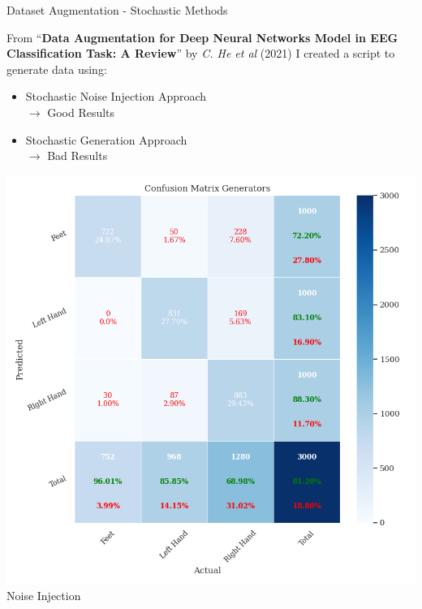 \begin{frame}{Dataset Augmentation - Stochastic Methods}
    \begin{minipage}[c]{.65\textwidth}            
        From ``\textbf{Data Augmentation for Deep Neural Networks Model in EEG Classification Task: A Review}'' by \textit{C. He et al} (2021) I created a script to generate data using:
        \begin{itemize}
            \item Stochastic Noise Injection Approach\\$\rightarrow{}$ Good Results
            \item Stochastic Generation Approach\\$\rightarrow{}$ Bad Results
        \end{itemize}
    \end{minipage}
    \begin{minipage}[c]{.33\textwidth}
            \centering
            \includegraphics[width=.8\textwidth]{figures/augmentation/stochastic/confusion_matrix_generators_2024_03_30_18_00_20_noise_injector_using_LSTMNet_0.5943600867678959.pkl.png}\\
            {\tiny Noise Injection}\\

\end{minipage}
\end{frame}
